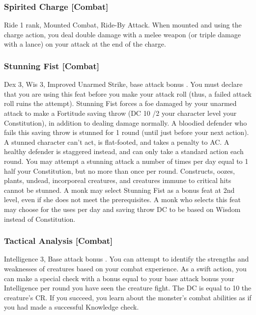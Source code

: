 \subsubsection{Spirited Charge [Combat]}
 Ride 1 rank, Mounted Combat, Ride-By Attack.
 When mounted and using the charge action, you deal double damage with a melee weapon (or triple damage with a lance) on your attack at the end of the charge.%

\subsubsection{Stunning Fist [Combat]}
 Dex 3, Wis 3, Improved Unarmed Strike, base attack bonus .
 You must declare that you are using this feat before you make your attack roll (thus, a failed attack roll ruins the attempt). Stunning Fist forces a foe damaged by your unarmed attack to make a Fortitude saving throw (DC 10 /2 your character level \add your Constitution), in addition to dealing damage normally. A bloodied defender who fails this saving throw is stunned for 1 round (until just before your next action). A stunned character can't act, is flat-footed, and takes a  penalty to AC. A healthy defender is staggered instead, and can only take a standard action each round. You may attempt a stunning attack a number of times per day equal to 1 \add half your Constitution, but no more than once per round. Constructs, oozes, plants, undead, incorporeal creatures, and creatures immune to critical hits cannot be stunned.
 A monk may select Stunning Fist as a bonus feat at 2nd level, even if she does not meet the prerequisites. A monk who selects this feat may choose for the uses per day and saving throw DC to be based on Wisdom instead of Constitution.

\subsubsection{Tactical Analysis [Combat]}
 Intelligence 3, Base attack bonus .
 You can attempt to identify the strengths and weaknesses of creatures based on your combat experience. As a swift action, you can make a special check with a bonus equal to your base attack bonus \add your Intelligence  per round you have seen the creature fight. The DC is equal to 10 \add the creature's CR. If you succeed, you learn about the monster's combat abilities as if you had made a successful Knowledge check.

